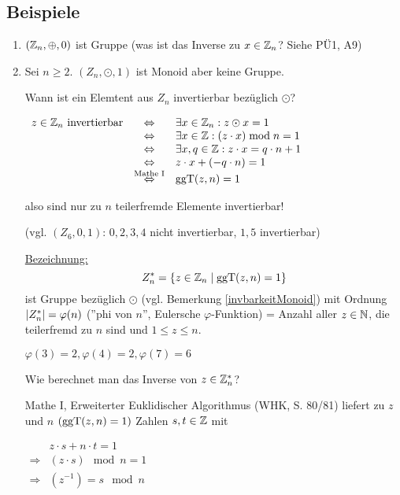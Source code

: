 \subsection{Beispiele}
\label{gruppenbeispiele}
\begin{enumerate}
	
	\item
	$(\mathbb{Z}_n, \oplus, 0)$ ist Gruppe (was ist das Inverse zu $x \in \mathbb{Z}_n$? Siehe PÜ1, A9)
	
	\item
	Sei $n \geq 2$. $(Z_n, \odot, 1)$ ist Monoid aber keine Gruppe. 
	
	Wann ist ein Elemtent aus $Z_n$ invertierbar bezüglich $\odot$?
	
	$\begin{array}{lcl}
	z \in \mathbb{Z}_n \text{ invertierbar} 
		&\Leftrightarrow&
		\exists x \in \mathbb{Z}_n : z \odot x = 1 \\
		&\Leftrightarrow&
		 \exists x \in \mathbb{Z}: (z \cdot x) \;\mathrm{ mod }\;{n} = 1 \\
		&\Leftrightarrow&
		\exists x, q \in \mathbb{Z}: z \cdot x = q \cdot n + 1 \\
		&\Leftrightarrow&
		z \cdot x + (-q \cdot n) = 1 \\
		&\stackrel{\text{Mathe I}}{\Leftrightarrow}&
		\mathrm{ ggT }(z, n) = 1 
	\end{array}$
	
	also sind nur zu $n$ teilerfremde Elemente invertierbar!
	
	(vgl. $(Z_6, 0, 1)$: $0, 2, 3, 4$ nicht invertierbar, $1, 5$ invertierbar)
	
	\underline{Bezeichnung:}
	\[Z_n^* = \left\{z \in \mathbb{Z}_n \;|\; \mathrm{ ggT }(z, n) = 1\right\}\]
	ist Gruppe bezüglich $\odot$ (vgl. Bemerkung \ref{invbarkeitMonoid}) mit Ordnung $\left|Z_n^*\right|=\varphi(n)$ (''phi von $n$'', Eulersche $\varphi$-Funktion) = Anzahl aller $z \in \mathbb{N}$, die teilerfremd zu $n$ sind und $1 \leq z \leq n$.
	
	$\varphi(3) = 2, \varphi(4)=2, \varphi(7) = 6$

	Wie berechnet man das Inverse von $z \in \mathbb{Z}_n^*$?
	
	Mathe I, Erweiterter Euklidischer Algorithmus (WHK, S. 80/81) liefert zu $z$ und $n$ $(\mathrm{ ggT }(z, n) = 1)$ Zahlen $s, t \in \mathbb{Z}$ mit 
	
	$\begin{array}{cl}
	& z \cdot s + n \cdot t = 1 \\
	\Rightarrow & (z \cdot s) \mod n = 1 \\
	\Rightarrow & (z^{-1}) = s \mod n
	\end{array}$
	

\end{enumerate}
